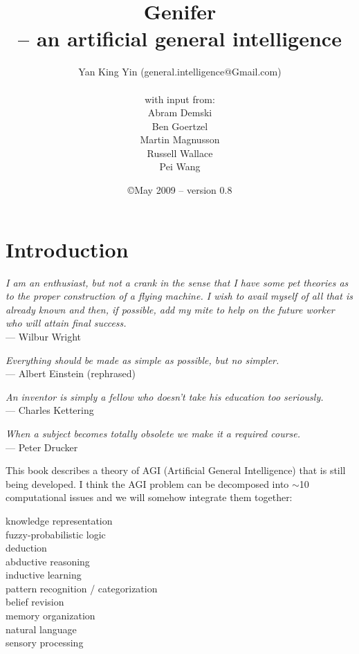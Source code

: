 \documentclass[a4paper]{report}
\title{\textbf{Genifer\\-- an artificial general intelligence}}
\author{Yan King Yin (general.intelligence@Gmail.com)\\ \\
with input from:\\
Abram Demski\\
Ben Goertzel\\
Martin Magnusson\\
Russell Wallace\\
Pei Wang
}
\date{\copyright May 2009 -- version 0.8}
\begin{document}
\maketitle
\dominitoc
\tableofcontents

\chapter{Introduction}
\begin{flushright}
\emph{I am an enthusiast, but not a crank in the sense that I have some pet theories as to the proper construction of a flying machine. I wish to avail myself of all that is already known and then, if possible, add my mite to help on the future worker who will attain final success.}\\
--- Wilbur Wright
\end{flushright}

\begin{flushright}
\emph{Everything should be made as simple as possible, but no simpler.}\\
--- Albert Einstein (rephrased)
\end{flushright}

\begin{flushright}
\emph{An inventor is simply a fellow who doesn't take his education too seriously.}\\
--- Charles Kettering 
\end{flushright}

\begin{flushright}
\emph{When a subject becomes totally obsolete we make it a required course.}\\
--- Peter Drucker
\end{flushright}
\minitoc

This book describes a theory of AGI (Artificial General Intelligence) \citep*{Goertzel2007} that is still being developed.  I think the AGI problem can be decomposed into $\sim$10 computational issues and we will somehow integrate them together:

\leftskip 1cm
knowledge representation\\
fuzzy-probabilistic logic\\
deduction\\
abductive reasoning\\
inductive learning\\
pattern recognition / categorization\\
belief revision\\
memory organization\\
natural language\\
sensory processing
\end{document}
